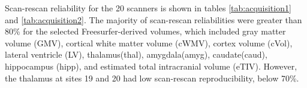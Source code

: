 Scan-rescan reliability for the 20 scanners is shown in tables \ref{tab:acquisition1} and \ref{tab:acquisition2}. The majority of scan-rescan reliabilities were greater than 80\% for the selected Freesurfer-derived volumes, which included gray matter volume (GMV), cortical white matter volume (cWMV), cortex volume (cVol), lateral ventricle (LV), thalamus(thal), amygdala(amyg), caudate(caud), hippocampus (hipp), and estimated total intracranial volume (eTIV). However, the thalamus at sites 19 and 20 had low scan-rescan reproducibility, below 70\%. %